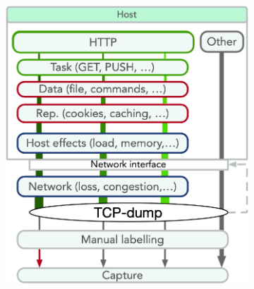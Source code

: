 \documentclass[runningheads]{llncs}
\begin{document}
\begin{figure}
\centering
\begin{subfigure}[b]{0.48\textwidth}
\includegraphics[width=\textwidth]{images/VM_setup_final.png}
\vspace{0.0cm}
\vspace{-0.09cm}
\end{subfigure}
\begin{subfigure}[b]{0.48\textwidth}

\end{subfigure}
\end{figure}
\end{document}
